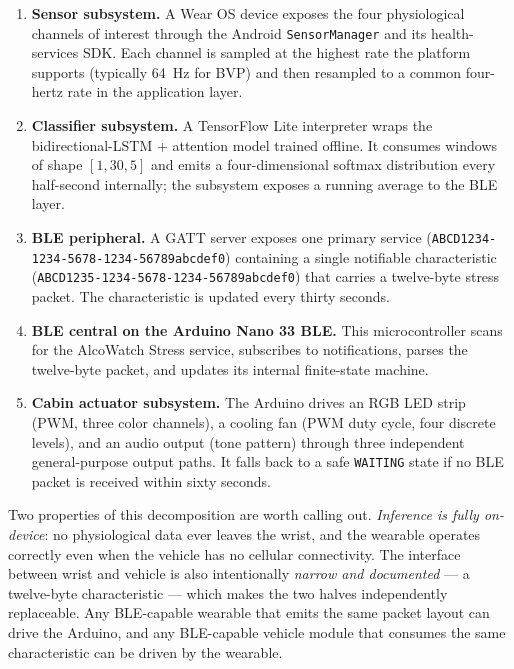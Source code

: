 \begin{enumerate}
  \item \textbf{Sensor subsystem.} A Wear OS device exposes the four
  physiological channels of interest through the Android \texttt{SensorManager}
  and its health-services SDK. Each channel is sampled at the highest
  rate the platform supports (typically 64~Hz for BVP) and then
  resampled to a common four-hertz rate in the application layer.

  \item \textbf{Classifier subsystem.} A TensorFlow Lite interpreter
  \citep{tflite2023} wraps the bidirectional-LSTM + attention model
  trained offline. It consumes windows of shape
  $[1, 30, 5]$ and emits a four-dimensional softmax distribution
  every half-second internally; the subsystem exposes a running
  average to the BLE layer.

  \item \textbf{BLE peripheral.} A GATT server exposes one primary
  service (\texttt{ABCD1234-1234-5678-1234-56789abcdef0}) containing a
  single notifiable characteristic
  (\texttt{ABCD1235-1234-5678-1234-56789abcdef0}) that carries a
  twelve-byte stress packet. The characteristic is updated every
  thirty seconds.

  \item \textbf{BLE central on the Arduino Nano 33 BLE.} This
  microcontroller scans for the AlcoWatch Stress service, subscribes
  to notifications, parses the twelve-byte packet, and updates its
  internal finite-state machine.

  \item \textbf{Cabin actuator subsystem.} The Arduino drives an
  RGB LED strip (PWM, three color channels), a cooling fan (PWM
  duty cycle, four discrete levels), and an audio output (tone
  pattern) through three independent general-purpose output paths.
  It falls back to a safe \texttt{WAITING} state if no BLE packet
  is received within sixty seconds.
\end{enumerate}

Two properties of this decomposition are worth calling out.
\emph{Inference is fully on-device}: no physiological data ever
leaves the wrist, and the wearable operates correctly even when the
vehicle has no cellular connectivity. The interface between wrist and
vehicle is also intentionally \emph{narrow and documented} --- a
twelve-byte characteristic --- which makes the two halves independently
replaceable. Any BLE-capable wearable that emits the same packet layout
can drive the Arduino, and any BLE-capable vehicle module that consumes
the same characteristic can be driven by the wearable.

